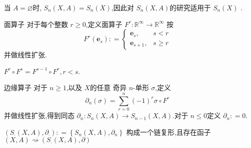 \documentclass[../../几何与拓扑.tex]{subfiles}
\begin{document}
\begin{remark}
    当 \(  A =  \varnothing  \)时, \(  S_{n}\left( X,A \right)=  S_{n}\left( X \right)    \),因此对 \(  S_{n}\left( X,A \right)   \)的研究适用于 \(  S_{n}\left( X \right)   \)    .
\end{remark}


\begin{definition}{面算子}
    对于每个整数 \(  r\ge 0  \),定义面算子 \(  F^{r}:\mathbb{R} ^{\infty}\to \mathbb{R} ^{\infty}  \) 按\[
    F^{r}\left( \mathbf{e}_{s}  \right): =  \begin{cases} \mathbf{e}_{s},& s< r\\ 
     \mathbf{e}_{s+ 1},& s\ge r \end{cases}  
    \] 并做线性扩张. 
\end{definition}

\begin{lemma}
    \(  F^{r} \circ F^{s}=  F^{s-1}\circ F^{r},r<s  \). 
\end{lemma}

\begin{definition}{边缘算子}
    对于 \(  n\ge 1  \),以及 \(  X  \)的任意 奇异 \(  n  \)-单形 \(   \sigma   \),定义 \[
    \partial _{n}\left(  \sigma  \right)= \sum _{r= 0}^{n} \left( -1 \right)^{r} \sigma \circ F^{r}  
    \]    并做线性扩张,得到同态 \(  \partial _{n}: S_{n}\left( X,A \right)\to S_{n-1}\left( X,A \right)    \).对于 \(  n\le 0  \)定义 \(  \partial _{n}: =  0  \).   
\end{definition}

\begin{proposition}
    \(  \left( S_\cdot \left( X,A \right),\partial _{\cdot }  \right): =  \left\{ S_{n}\left( X,A \right),\partial _{n}  \right\}   \) 构成一个链复形,且存在函子 \(  \left( X,A \right) \rightsquigarrow  \left( S_\cdot \left( X,A \right),\partial   \right)    \) 
\end{proposition}
\end{document}

